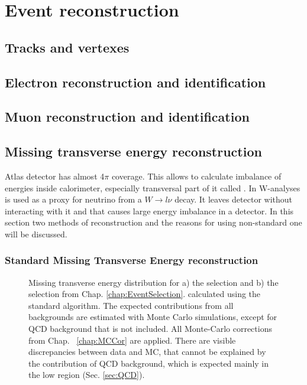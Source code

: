 \chapter{Event reconstruction}
\minitoc
\section{Tracks and vertexes}
\section{Electron reconstruction and identification}
\section{Muon reconstruction and identification}
\section{Missing transverse energy reconstruction}
Atlas detector has almost 4$\pi$ coverage. This allows to calculate imbalance of energies inside calorimeter, especially transversal part of it called \etmiss.  In W-analyses \etmiss is used as a proxy for neutrino from a $W \to l\nu$ decay. It leaves detector without interacting with it and that causes large energy imbalance in a detector. In this section two methods of \etmiss reconstruction and the reasons for using non-standard one will be discussed.

\subsection{Standard Missing Transverse Energy reconstruction}

\begin{figure}[!tb]
\begin{minipage}[h]{0.49\linewidth}
\end{minipage}
\hfill
\begin{minipage}[h]{0.49\linewidth}
\end{minipage}
\caption{Missing transverse energy distribution for a) the \wenu selection and  b) the \wmunu selection from Chap. \ref{chap:EventSelection}. \etmiss  calculated using the standard \atlas algorithm. The expected contributions from all backgrounds are estimated with Monte Carlo simulations, except for QCD background that is not included. All Monte-Carlo corrections from Chap. ~\ref{chap:MCCor} are applied. There are visible discrepancies between data and MC, that cannot be explained by the contribution of QCD background, which is expected mainly in the low \etmiss region (Sec. \ref{sec:QCD}).}
\label{ris:EtMissRefFinal}
\end{figure}

